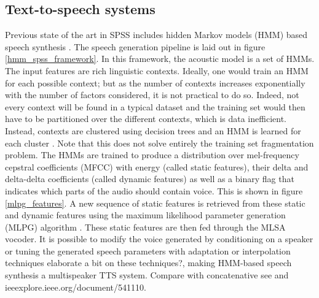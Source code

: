 \documentclass[a4paper, oneside, 12pt, english]{article}
\begin{document}
\subsection{Text-to-speech systems}
Previous state of the art in SPSS includes hidden Markov models (HMM) based speech synthesis \citep{Tokuda-2013}. The speech generation pipeline is laid out in figure \ref{hmm_spss_framework}. In this framework, the acoustic model is a set of HMMs. The input features are rich linguistic contexts. Ideally, one would train an HMM for each possible context; but as the number of contexts increases exponentially with the number of factors considered, it is not practical to do so. Indeed, not every context will be found in a typical dataset and the training set would then have to be partitioned over the different contexts, which is data inefficient. Instead, contexts are clustered using decision trees and an HMM is learned for each cluster \citep{HMMTTS}. Note that this does not solve entirely the training set fragmentation problem. The HMMs are trained to produce a distribution over mel-frequency cepstral coefficients (MFCC) with energy (called static features), their delta and delta-delta coefficients (called dynamic features) as well as a binary flag that indicates which parts of the audio should contain voice. This is shown in figure \ref{mlpg_features}. A new sequence of static features is retrieved from these static and dynamic features using the maximum likelihood parameter generation (MLPG) algorithm \citep{Tokuda-2000}. These static features are then fed through the MLSA vocoder\citep{MLSA}. It is possible to modify the voice generated by conditioning on a speaker or tuning the generated speech parameters with adaptation or interpolation techniques \citep{HMMSpeakerInterpolation} \color{red} elaborate a bit on these techniques?\color{black}, making HMM-based speech synthesis a multispeaker TTS system. \color{red} Compare with concatenative see \citep{SPSSDNN} and ieeexplore.ieee.org/document/541110.\color{black}
\end{document}
